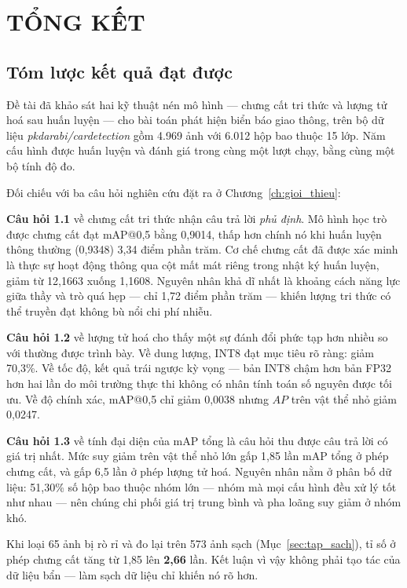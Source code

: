 \chapter{TỔNG KẾT}
\label{ch:tong_ket}

\section{Tóm lược kết quả đạt được}

Đề tài đã khảo sát hai kỹ thuật nén mô hình --- chưng cất tri thức và lượng tử hoá sau huấn luyện
--- cho bài toán phát hiện biển báo giao thông, trên bộ dữ liệu \textit{pkdarabi/cardetection} gồm
4.969 ảnh với 6.012 hộp bao thuộc 15 lớp. Năm cấu hình được huấn luyện và đánh giá trong cùng một
lượt chạy, bằng cùng một bộ tính độ đo.

Đối chiếu với ba câu hỏi nghiên cứu đặt ra ở Chương~\ref{ch:gioi_thieu}:

\textbf{Câu hỏi 1.1} về chưng cất tri thức nhận câu trả lời \emph{phủ định}. Mô hình học trò được
chưng cất đạt mAP@0,5 bằng 0,9014, thấp hơn chính nó khi huấn luyện thông thường (0,9348) 3,34 điểm
phần trăm. Cơ chế chưng cất đã được xác minh là thực sự hoạt động thông qua cột mất mát riêng trong
nhật ký huấn luyện, giảm từ 12,1663 xuống 1,1608. Nguyên nhân khả dĩ nhất là khoảng cách năng lực
giữa thầy và trò quá hẹp --- chỉ 1,72 điểm phần trăm --- khiến lượng tri thức có thể truyền đạt
không bù nổi chi phí nhiễu.

\textbf{Câu hỏi 1.2} về lượng tử hoá cho thấy một sự đánh đổi phức tạp hơn nhiều so với thường được
trình bày. Về dung lượng, INT8 đạt mục tiêu rõ ràng: giảm 70,3\%. Về tốc độ, kết quả trái ngược kỳ
vọng --- bản INT8 chậm hơn bản FP32 hơn hai lần do môi trường thực thi không có nhân tính toán số
nguyên được tối ưu. Về độ chính xác, mAP@0,5 chỉ giảm 0,0038 nhưng $AP$ trên vật thể nhỏ giảm
0,0247.

\textbf{Câu hỏi 1.3} về tính đại diện của mAP tổng là câu hỏi thu được câu trả lời có giá trị nhất.
Mức suy giảm trên vật thể nhỏ lớn gấp 1,85 lần mAP tổng ở phép chưng cất, và gấp 6,5 lần ở phép
lượng tử hoá. Nguyên nhân nằm ở phân bố dữ liệu: 51,30\% số hộp bao thuộc nhóm lớn --- nhóm mà mọi
cấu hình đều xử lý tốt như nhau --- nên chúng chi phối giá trị trung bình và pha loãng suy giảm ở
nhóm khó.

Khi loại 65 ảnh bị rò rỉ và đo lại trên 573 ảnh sạch (Mục~\ref{sec:tap_sach}), tỉ số ở phép chưng
cất tăng từ 1,85 lên \textbf{2,66} lần. Kết luận vì vậy không phải tạo tác của dữ liệu bẩn --- làm
sạch dữ liệu chỉ khiến nó rõ hơn.

